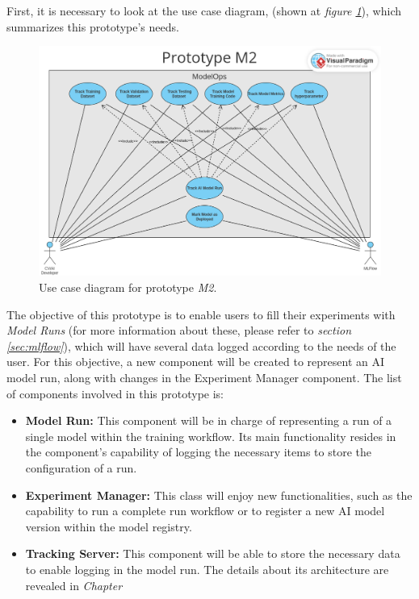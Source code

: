 First, it is necessary to look at the use case diagram, (shown at \emph{figure \ref{fig:useCaseM2}}), which summarizes this prototype's needs.

\begin{figure}[H]
    \centering
    \includegraphics[width=0.7\linewidth]{figs/use-case-M2.png}
    \caption{Use case diagram for prototype \emph{M2}.}
    \label{fig:useCaseM2}
\end{figure}

The objective of this prototype is to enable users to fill their experiments with \emph{Model Runs} (for more information about these, please refer to
\emph{section \ref{sec:mlflow}}), which will have several data logged according to the needs of the user. For this objective, a new component will be created 
to represent an \acrshort{AI} model run, along with changes in the Experiment Manager component. The list of components involved in this prototype is:

\begin{itemize}
    \item \textbf{Model Run:} This component will be in charge of representing a run of a single model within the training workflow. Its main functionality
    resides in the component's capability of logging the necessary items to store the configuration of a run.

    \item \textbf{Experiment Manager: }This class will enjoy new functionalities, such as the capability to run a complete run workflow or to register a new \acrshort{AI} 
    model version within the model registry.

    \item \textbf{Tracking Server: }This component will be able to store the necessary data to enable logging in the model run. The details about its architecture are revealed in \emph{Chapter }
\end{itemize}

